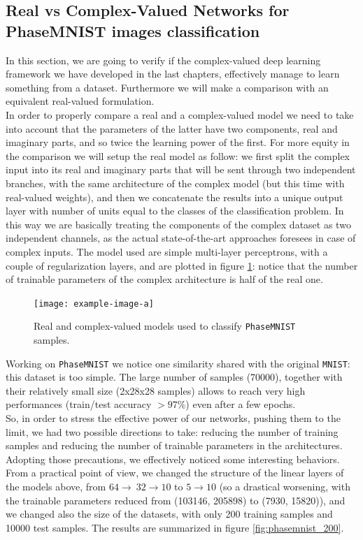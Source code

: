 \documentclass[../main.tex]{subfiles}
\begin{document}
\subsection*{Real vs Complex-Valued Networks for PhaseMNIST images classification}

In this section, we are going to verify if the complex-valued deep learning framework we have developed in the last chapters, effectively manage to learn something from a dataset. Furthermore we will make a comparison with an equivalent real-valued formulation.\\
In order to properly compare a real and a complex-valued model we need to take into account that the parameters of the latter have two components, real and imaginary parts, and so twice the learning power of the first. For more equity in the comparison we will setup the real model as follow: we first split the complex input into its real and imaginary parts that will be sent through two independent branches, with the same architecture of the complex model (but this time with real-valued weights), and then we concatenate the results into a unique output layer with number of units equal to the classes of the classification problem. In this way we are basically treating the components of the complex dataset as two independent channels, as the actual state-of-the-art approaches foresees in case of complex inputs. The model used are simple multi-layer perceptrons, with a couple of regularization layers, and are plotted in figure \ref{fig:phasemnist_models}: notice that the number of trainable parameters of the complex architecture is half of the real one.
\begin{figure}[!ht]
	\centering
	\texttt{[image: example-image-a]}
	\caption{Real and complex-valued models used to classify \texttt{PhaseMNIST} samples.}
	\label{fig:phasemnist_models}
\end{figure}
Working on \texttt{PhaseMNIST} we notice one similarity shared with the original \texttt{MNIST}: this dataset is too simple. The large number of samples (70000), together with their relatively small size (2x28x28 samples) allows to reach very high performances (train/test accuracy $>97\%$) even after a few epochs.\\
So, in order to stress the effective power of our networks, pushing them to the limit, we had two possible directions to take: reducing the number of training samples and reducing the number of trainable parameters in the architectures. Adopting those precautions, we effectively noticed some interesting behaviors. From a practical point of view, we changed the structure of the linear layers of the models above, from $64\to\ 32\to 10$ to $5\to 10$ (so a drastical worsening, with the trainable parameters reduced from (103146, 205898) to (7930, 15820)), and we changed also the size of the datasets, with only 200 training samples and 10000 test samples. The results are summarized in figure \ref{fig:phasemnist_200}.
\end{document}
